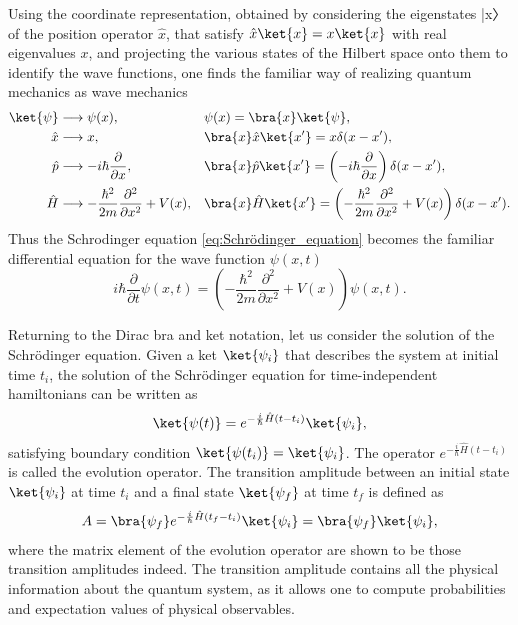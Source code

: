 Using the coordinate representation, obtained by considering the eigenstates |x〉 of the position operator \(\hat{x}\), that satisfy \(\hat{x}\ket{x} = x\ket{x}\) with real eigenvalues \(x\), and projecting the various states of the Hilbert space onto them to identify the wave functions, one finds the familiar way of realizing quantum mechanics as wave mechanics
\[
    \begin{aligned}
        \ket{\psi} & \longrightarrow \psi(x),                                                    &  & \psi(x) = \bra{x}\ket{\psi},                                                                                                   \\
        \hat{x}    & \longrightarrow x,                                                          &  & \bra{x}\hat{x}\ket{x^{\prime}} = x \delta(x-x^{\prime}),                                                                       \\
        \hat{p}    & \longrightarrow -i\hbar \frac{\partial}{\partial x},                        &  & \bra{x}\hat{p}\ket{x^{\prime}} = \left( -i\hbar \frac{\partial}{\partial x} \right) \delta(x-x^{\prime}),                      \\
        \hat{H}    & \longrightarrow -\frac{\hbar^2}{2m} \frac{\partial^2}{\partial x^2} + V(x), &  & \bra{x}\hat{H}\ket{x^{\prime}} = \left(-\frac{\hbar^2}{2m} \frac{\partial^2}{\partial x^2} + V(x)\right) \delta(x-x^{\prime}).
    \end{aligned}
\]
Thus the Schrodinger equation \eqref{eq:Schrödinger_equation} becomes the familiar differential equation for the wave function \(\psi(x,t)\)
\[
    i\hbar \frac{\partial}{\partial t} \psi(x,t) = \left(-\frac{\hbar^2}{2m} \frac{\partial^2}{\partial x^2} + V(x)\right) \psi(x,t).
\]

Returning to the Dirac bra and ket notation, let us consider the solution of the Schrödinger equation. Given a ket \(\ket{\psi_i}\) that describes the system at initial time \(t_i\), the solution of the Schrödinger equation for time-independent hamiltonians can be written as
\[
    \ket{\psi(t)} = e^{-\frac{i}{\hbar} \hat{H} (t - t_i)} \ket{\psi_i},
\]
satisfying boundary condition \(\ket{\psi(t_i)} = \ket{\psi_i}\). The operator \(e^{-\frac{i}{\hbar} \hat{H} (t - t_i)}\) is called the evolution operator. The transition amplitude between an initial state \(\ket{\psi_i}\) at time \(t_i\) and a final state \(\ket{\psi_f}\) at time \(t_f\) is defined as
\[
    A = \bra{\psi_f} e^{-\frac{i}{\hbar} \hat{H} (t_f - t_i)} \ket{\psi_i} = \bra{\psi_f}\ket{\psi_i},
\]
where the matrix element of the evolution operator are shown to be those transition amplitudes indeed. The transition amplitude contains all the physical information about the quantum system, as it allows one to compute probabilities and expectation values of physical observables.

